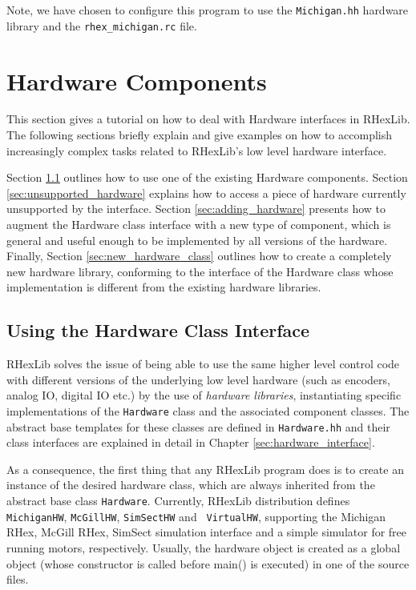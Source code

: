 Note, we have
chosen to configure this program to use the {\tt Michigan.hh} hardware library
and the {\tt rhex\_michigan.rc} file.

\section{Hardware Components}

This section gives a tutorial on how to deal with Hardware interfaces in
RHexLib. The following sections briefly explain and give examples on how to
accomplish increasingly complex tasks related to RHexLib's low level
hardware interface.

Section \ref{sec:using_hardware} outlines how to use one of the existing
Hardware components. Section \ref{sec:unsupported_hardware} explains how to
access a piece of hardware currently unsupported by the interface. Section
\ref{sec:adding_hardware} presents how to augment the Hardware class
interface with a new type of component, which is general and useful enough
to be implemented by all versions of the hardware. Finally, Section
\ref{sec:new_hardware_class} outlines how to create a completely new
hardware library, conforming to the interface of the Hardware class whose
implementation is different from the existing hardware libraries.

\subsection{Using the Hardware Class Interface}
\label{sec:using_hardware}

RHexLib solves the issue of being able to use the same higher level control
code with different versions of the underlying low level hardware (such as
encoders, analog IO, digital IO etc.) by the use of {\em hardware
libraries}, instantiating specific implementations of the {\tt Hardware}
class and the associated component classes. The abstract base templates for
these classes are defined in {\tt Hardware.hh} and their class interfaces
are explained in detail in Chapter \ref{sec:hardware_interface}.

As a consequence, the first thing that any RHexLib program does is to create
an instance of the desired hardware class, which are always inherited from
the abstract base class {\tt Hardware}. Currently, RHexLib distribution
defines {\tt MichiganHW}, {\tt McGillHW}, {\tt SimSectHW} and {\tt
  VirtualHW}, supporting the Michigan RHex, McGill RHex, SimSect simulation
interface and a simple simulator for free running motors,
respectively. Usually, the hardware object is created as a global object
(whose constructor is called before main() is executed) in one of the source
files.

